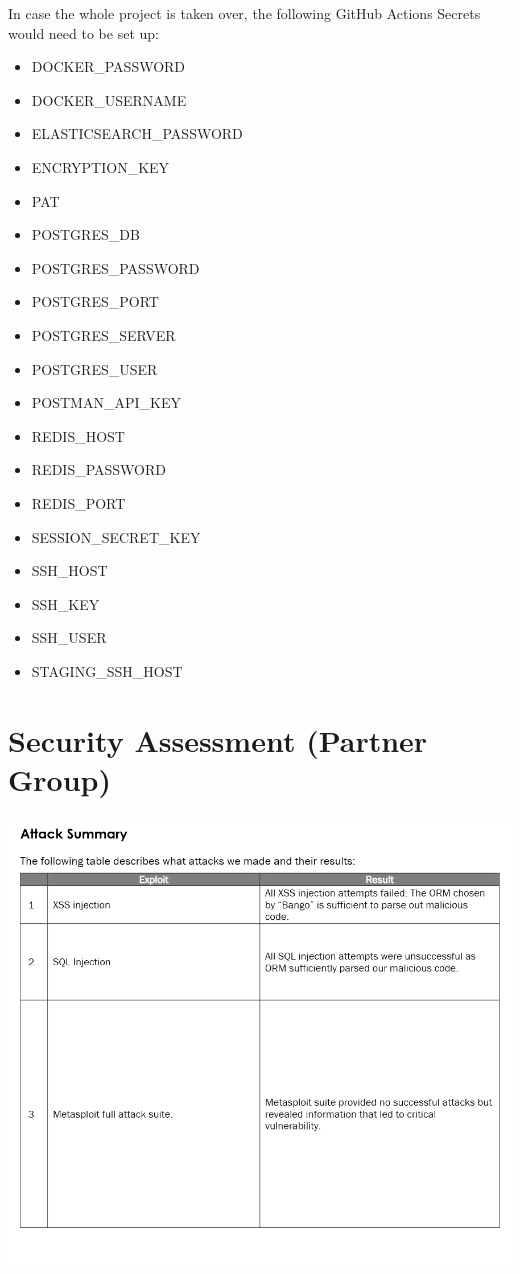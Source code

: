 In case the whole project is taken over, the following GitHub Actions Secrets would need to be set up:
\begin{itemize}
    \item DOCKER\_PASSWORD
    \item DOCKER\_USERNAME
    \item ELASTICSEARCH\_PASSWORD
    \item ENCRYPTION\_KEY
    \item PAT
    \item POSTGRES\_DB
    \item POSTGRES\_PASSWORD
    \item POSTGRES\_PORT
    \item POSTGRES\_SERVER
    \item POSTGRES\_USER
    \item POSTMAN\_API\_KEY
    \item REDIS\_HOST
    \item REDIS\_PASSWORD
    \item REDIS\_PORT
    \item SESSION\_SECRET\_KEY
    \item SSH\_HOST
    \item SSH\_KEY
    \item SSH\_USER
    \item STAGING\_SSH\_HOST
\end{itemize}

\section{Security Assessment (Partner Group)}
\label{appendix:securityAssessment}

\includegraphics[width=1\textwidth]{images/Attack P1.png}

